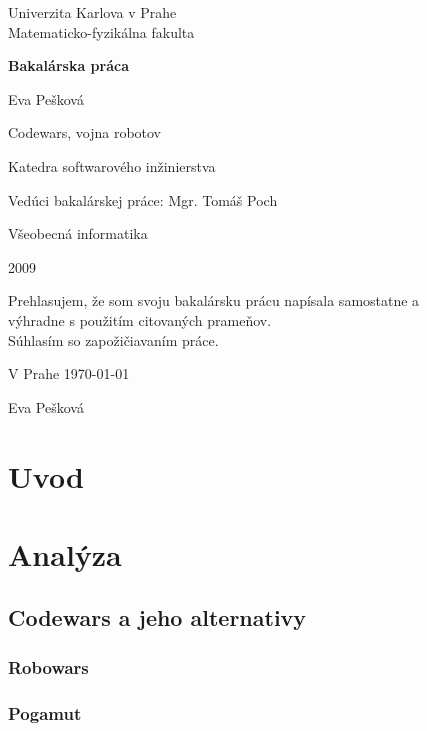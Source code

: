 \documentclass[a4paper,11pt,final]{report}
\begin{document}
\begin{titlepage}
\begin{center}
\vspace{1.5in}
{\rm Univerzita Karlova v Prahe\\
    Matematicko-fyzikálna fakulta}
\par
\vspace{0.7in}
{\huge \bf Bakalárska práca}
\par
\vspace{0.5in}
{Eva Pešková}
\par
\vspace{0.5in}
Codewars, vojna robotov
\par
\vfill
Katedra softwarového inžinierstva
\par
\vspace{0.5in}
Vedúci bakalárskej práce: Mgr. Tomáš Poch
\par
\vspace{0.5in}
Všeobecná informatika
\par
\vspace{0.5in}
2009
\end{center}
\end{titlepage}
\vfill
Prehlasujem, že som svoju bakalársku prácu napísala samostatne a \\
výhradne s použitím citovaných prameňov. \\
Súhlasím so zapožičiavaním práce.\\
\par
V Prahe \today
\begin{flushright}
Eva Pešková
\end{flushright}
\tableofcontents
\chapter{Uvod}%
\chapter{Analýza}
\section{Codewars a jeho alternativy}
\subsection {Robowars}
\subsection {Pogamut}
\end{document}
